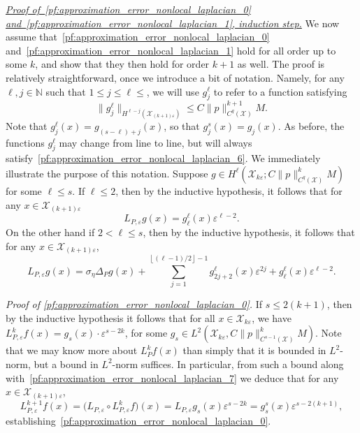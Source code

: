 \documentclass[aos]{imsart}
\theoremstyle{plain}
\theoremstyle{definition}
\theoremstyle{remark}
\newcommand{\mc}[1]{\mathcal{#1}}
\newcommand{\floor}[1]{\left\lfloor #1 \right\rfloor}
\newcommand{\1}{\mathbf{1}}
\begin{document}
\underline{\textit{Proof of~\eqref{pf:approximation_error_nonlocal_laplacian_0} and~\eqref{pf:approximation_error_nonlocal_laplacian_1}, induction step.}}
We now assume that~\eqref{pf:approximation_error_nonlocal_laplacian_0} and~\eqref{pf:approximation_error_nonlocal_laplacian_1} hold for all order up to some $k$, and show that they then hold for order $k + 1$ as well. The proof is relatively straightforward, once we introduce a bit of notation. Namely, for any $\ell,j \in \mathbb{N}$ such that $1 \leq j \leq \ell \leq$, we will use $g_j^{\ell}$ to refer to a function satisfying
\begin{equation}
\label{pf:approximation_error_nonlocal_laplacian_6}
\|g_j^{\ell}\|_{H^{\ell - j}(\mc{X}_{(k + 1)\varepsilon})} \leq C \|p\|_{C^{q}(\mc{X})}^{k + 1} M.
\end{equation}
Note that $g_j^{\ell}(x) = g_{(s - \ell) + j}(x)$, so that $g_j^{s}(x) = g_j(x)$. As before, the functions $g_j^{\ell}$ may change from line to line, but will always satisfy~\eqref{pf:approximation_error_nonlocal_laplacian_6}. We immediately illustrate the purpose of this notation. Suppose $g \in H^{\ell}(\mc{X}_{k\varepsilon}; C \|p\|_{C^{q}(\mc{X})}^k M)$ for some $\ell \leq s$. If $\ell \leq 2$, then by the inductive hypothesis, it follows that for any $x \in \mc{X}_{(k + 1)\varepsilon}$
\begin{equation}
\label{pf:approximation_error_nonlocal_laplacian_7}
L_{P,\varepsilon}g(x) = g_{\ell}^{\ell}(x) \varepsilon^{\ell - 2}.
\end{equation} 
On the other hand if $2 < \ell \leq s$, then by the inductive hypothesis, it follows that for any $x \in \mc{X}_{(k + 1)\varepsilon}$,
\begin{equation}
\label{pf:approximation_error_nonlocal_laplacian_8}
L_{P,\varepsilon}g(x) = \sigma_{\eta} \Delta_Pg(x) + \sum_{j = 1}^{\floor{(\ell - 1)/2} - 1} g_{2j + 2}^{\ell}(x) \varepsilon^{2j} + g_{\ell}^{\ell}(x) \varepsilon^{\ell - 2}.
\end{equation}

\emph{Proof of \eqref{pf:approximation_error_nonlocal_laplacian_0}.} If $s \leq 2(k + 1)$, then by the inductive hypothesis it follows that for all $x \in \mc{X}_{k\varepsilon}$, we have $L_{P,\varepsilon}^kf(x) = g_{s}(x) \cdot \varepsilon^{s - 2k}$, for some $g_s \in L^2(\mc{X}_{k\varepsilon}, C\|p\|_{C^{s - 1}(\mc{X})}^k M)$. Note that we may know more about $L_P^kf(x)$ than simply that it is bounded in $L^2$-norm, but a bound in $L^2$-norm suffices. In particular, from such a bound along with~\eqref{pf:approximation_error_nonlocal_laplacian_7} we deduce that for any $x \in \mc{X}_{(k + 1)\varepsilon}$,
\begin{equation}
\label{pf:approximation_error_nonlocal_laplacian_8.5}
L_{P,\varepsilon}^{k + 1}f(x) = \bigl(L_{P,\varepsilon} \circ L_{P,\varepsilon}^k f)(x)= L_{P,\varepsilon} g_s(x)\varepsilon^{s - 2k} = g_{s}^{s}(x) \varepsilon^{s - 2(k + 1)},
\end{equation}
establishing~\eqref{pf:approximation_error_nonlocal_laplacian_0}. 
\end{document}
